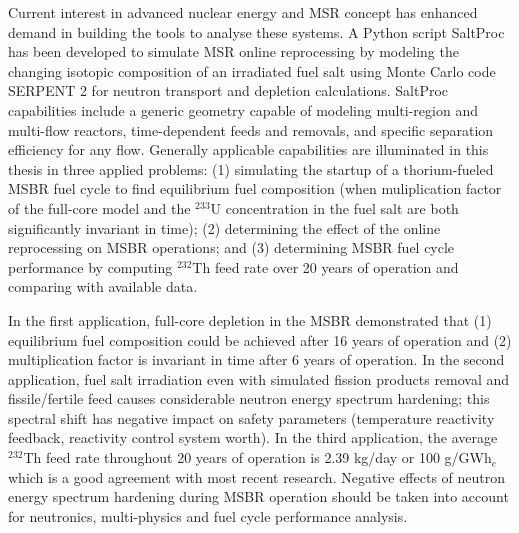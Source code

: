 Current interest in advanced nuclear energy and \gls{MSR} concept has enhanced demand in building the tools to analyse these systems. A Python script SaltProc has been developed to simulate \gls{MSR} online reprocessing by modeling the changing isotopic composition of an irradiated fuel salt using Monte Carlo code SERPENT 2 for neutron transport and depletion calculations. SaltProc capabilities include a generic geometry capable of modeling multi-region and multi-flow reactors, time-dependent feeds and removals, and specific separation efficiency for any flow. Generally applicable  capabilities are illuminated in this thesis in three applied problems: (1) simulating the startup of a thorium-fueled \gls{MSBR} fuel cycle to find equilibrium fuel composition (when muliplication factor of the full-core model and the $^{233}$U concentration in the fuel salt are both significantly invariant in time); (2) determining the effect of the online reprocessing on \gls{MSBR} operations; and (3) determining \gls{MSBR} fuel cycle performance by computing $^{232}$Th feed rate over 20 years of operation and comparing with available data.

In the first application, full-core depletion in the \gls{MSBR} demonstrated that (1) equilibrium fuel composition could be achieved after 16 years of operation and (2) multiplication factor is invariant in time after 6 years of operation. In the second application, fuel salt irradiation even with simulated fission products removal and fissile/fertile feed causes considerable neutron energy spectrum hardening; this spectral shift has negative impact on safety parameters (temperature reactivity feedback, reactivity control system worth). In the third application, the average $^{232}$Th feed rate throughout 20 years of operation is 2.39 kg/day or 100 g/GWh$_e$ which is a good agreement with most recent research. Negative effects of neutron energy spectrum hardening during \gls{MSBR} operation should be taken into account for neutronics, multi-physics and fuel cycle performance analysis.